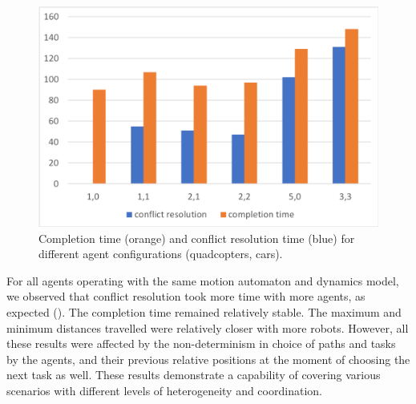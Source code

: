 \begin{figure}
\includegraphics[scale=0.3]{figs/completion.png}\hfill
\caption{\small Completion time (orange) and conflict resolution time (blue)  for different agent configurations (quadcopters, cars). }
\label{fig:completionstats}
\end{figure}



 For all agents operating with the same motion automaton and dynamics model, we observed that conflict resolution took more time with more agents, as expected (). The completion time remained relatively stable. The maximum and minimum distances travelled were relatively closer with more robots. However, all these results were affected by the non-determinism in choice of paths and tasks by the agents, and their previous relative positions at the moment of choosing the next task as well. These results demonstrate a capability of covering various scenarios with different levels of heterogeneity and coordination.
 
